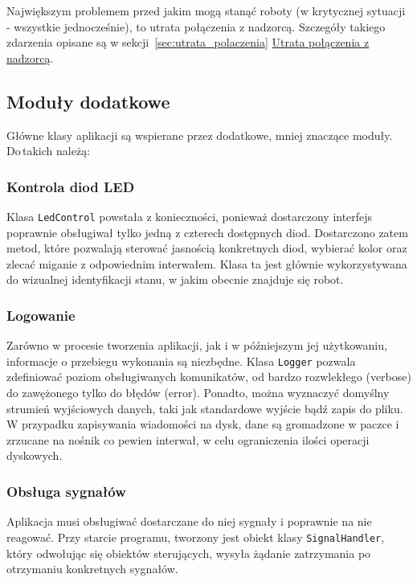 Największym problemem przed jakim mogą stanąć roboty (w krytycznej sytuacji - wszystkie jednocześnie), to utrata połączenia z nadzorcą. Szczegóły takiego zdarzenia opisane są w sekcji~\ref{sec:utrata_polaczenia} \hyperref[sec:utrata_polaczenia]{Utrata połączenia z nadzorcą}.

\subsection{Moduły dodatkowe}

Główne klasy aplikacji są wspierane przez dodatkowe, mniej znaczące moduły. Do\,takich należą:

\subsubsection{Kontrola diod LED}

Klasa {\tt LedControl} powstała z konieczności, ponieważ dostarczony interfejs poprawnie obsługiwał tylko jedną z czterech dostępnych diod. Dostarczono zatem metod, które pozwalają sterować jasnością konkretnych diod, wybierać kolor oraz zlecać miganie z odpowiednim interwałem. Klasa ta jest głównie wykorzystywana do wizualnej identyfikacji stanu, w jakim obecnie znajduje się robot.

\subsubsection{Logowanie}

Zarówno w procesie tworzenia aplikacji, jak i w późniejszym jej użytkowaniu, informacje o przebiegu wykonania są niezbędne. Klasa {\tt Logger} pozwala zdefiniować poziom obsługiwanych komunikatów, od bardzo rozwlekłego (verbose) do zawężonego tylko do błędów (error). Ponadto, można wyznaczyć domyślny strumień wyjściowych danych, taki jak standardowe wyjście bądź zapis do pliku. W przypadku zapisywania wiadomości na dysk, dane są gromadzone w paczce i zrzucane na nośnik co pewien interwał, w celu ograniczenia ilości operacji dyskowych.

\subsubsection{Obsługa sygnałów}

Aplikacja musi obsługiwać dostarczane do niej sygnały i poprawnie na nie reagować. Przy starcie programu, tworzony jest obiekt klasy {\tt SignalHandler}, który odwołując się obiektów sterujących, wysyła żądanie zatrzymania po otrzymaniu konkretnych sygnałów.

